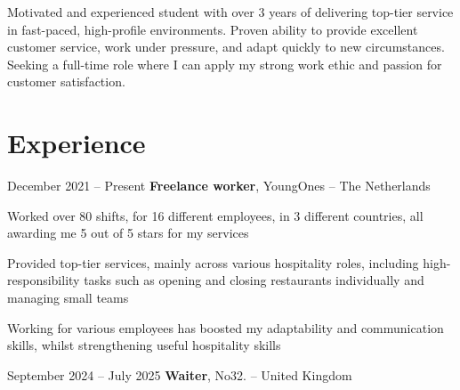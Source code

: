 



	\newcommand{\AND}{\unskip
		\cleaders\copy\ANDbox\hskip\wd\ANDbox
		\ignorespaces
	}
	\newsavebox\ANDbox
	\sbox\ANDbox{$|$}
	
		

	\begin{onecolentry}
		Motivated and experienced student with over 3 years of delivering top-tier service in fast-paced, high-profile environments. Proven ability to provide excellent customer service, work under pressure, and adapt quickly to new circumstances. Seeking a full-time role where I can apply my strong work ethic and passion for customer satisfaction.
	\end{onecolentry}
	
	\section{Experience}
	
	\begin{twocolentry}{
			December 2021 – Present
		}
		\textbf{Freelance worker}, YoungOnes -- The Netherlands
	\end{twocolentry}
	
	\vspace{0.10 cm}
	\begin{onecolentry}
		\begin{highlights}
			\item Worked over 80 shifts, for 16 different employees, in 3 different countries, all awarding me 5 out of 5 stars for my services
			\item Provided top-tier services, mainly across various hospitality roles, including high-responsibility tasks such as opening and closing restaurants individually and managing small teams
			\item Working for various employees has boosted my adaptability and communication skills, whilst strengthening useful hospitality skills
		\end{highlights}
	\end{onecolentry}
	
	\vspace{0.2 cm}
	
	\begin{twocolentry}{
		September 2024 – July 2025
	}
	\textbf{Waiter}, No32. -- United Kingdom\end{twocolentry}

	\vspace{0.10 cm}
	\begin{onecolentry}
		\begin{highlights}
			\item 
			\item 
			\item 
		\end{highlights}
	\end{onecolentry}
	
